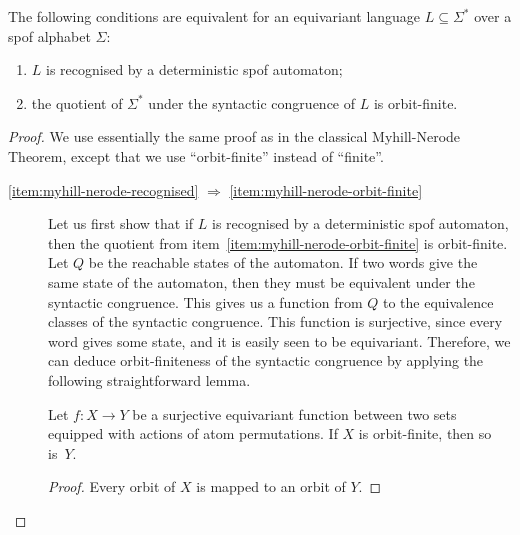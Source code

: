 \begin{theorem}\label{thm:myhill-nerode-subquotiented-pof}
    The following conditions are equivalent for an equivariant language $L \subseteq \Sigma^*$ over a spof alphabet $\Sigma$:
    \begin{enumerate}
        \item\label{item:myhill-nerode-recognised} $L$ is recognised by a deterministic spof automaton;
        \item\label{item:myhill-nerode-orbit-finite} the quotient of $\Sigma^*$ under the syntactic congruence of $L$ is orbit-finite.
    \end{enumerate}
\end{theorem}
\begin{proof} We use essentially the same proof as in the classical Myhill-Nerode Theorem, except that we use ``orbit-finite'' instead of ``finite''.

    \begin{description}
        \item[\ref{item:myhill-nerode-recognised} $\Rightarrow$ 
        \ref{item:myhill-nerode-orbit-finite}]     Let us first show that if $L$ is recognised by a deterministic spof automaton, then the quotient from item~\ref{item:myhill-nerode-orbit-finite} is orbit-finite. Let $Q$ be the reachable states of the automaton. If two words give the same state of the automaton, then they must be equivalent under the syntactic congruence. This gives us a function from $Q$ to the equivalence classes of the syntactic congruence. This function is surjective, since every word gives some state, and it is easily seen to be equivariant. Therefore, we can deduce orbit-finiteness of the syntactic congruence by applying the following straightforward lemma.
    
        \begin{lemma}
            Let $f : X \to Y$ be a surjective equivariant function between two sets equipped with actions of atom permutations. If $X$ is orbit-finite, then so is~$Y$.
        \end{lemma}
        \begin{proof}
            Every orbit of $X$ is mapped to an orbit of $Y$.
        \end{proof}


\end{description}
\end{proof}
